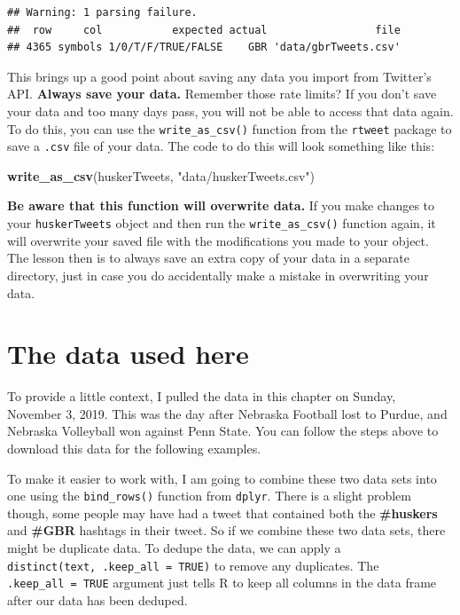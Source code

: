 \documentclass[
]{book}
\newenvironment{Shaded}{\begin{snugshade}}{\end{snugshade}}
\newcommand{\KeywordTok}[1]{\textcolor[rgb]{0.13,0.29,0.53}{\textbf{#1}}}
\newcommand{\NormalTok}[1]{#1}
\newcommand{\StringTok}[1]{\textcolor[rgb]{0.31,0.60,0.02}{#1}}
\begin{document}
\begin{verbatim}
## Warning: 1 parsing failure.
##  row     col           expected actual                 file
## 4365 symbols 1/0/T/F/TRUE/FALSE    GBR 'data/gbrTweets.csv'
\end{verbatim}

This brings up a good point about saving any data you import from Twitter's API. \textbf{Always save your data.} Remember those rate limits? If you don't save your data and too many days pass, you will not be able to access that data again. To do this, you can use the \texttt{write\_as\_csv()} function from the \texttt{rtweet} package to save a \texttt{.csv} file of your data. The code to do this will look something like this:

\begin{Shaded}
\begin{Highlighting}[]
\KeywordTok{write_as_csv}\NormalTok{(huskerTweets, }\StringTok{"data/huskerTweets.csv"}\NormalTok{)}
\end{Highlighting}
\end{Shaded}

\textbf{Be aware that this function will overwrite data.} If you make changes to your \texttt{huskerTweets} object and then run the \texttt{write\_as\_csv()} function again, it will overwrite your saved file with the modifications you made to your object. The lesson then is to always save an extra copy of your data in a separate directory, just in case you do accidentally make a mistake in overwriting your data.

\hypertarget{the-data-used-here}{%
\section{The data used here}\label{the-data-used-here}}

To provide a little context, I pulled the data in this chapter on Sunday, November 3, 2019. This was the day after Nebraska Football lost to Purdue, and Nebraska Volleyball won against Penn State. You can follow the steps above to download this data for the following examples.

To make it easier to work with, I am going to combine these two data sets into one using the \texttt{bind\_rows()} function from \texttt{dplyr}. There is a slight problem though, some people may have had a tweet that contained both the \textbf{\#huskers} and \textbf{\#GBR} hashtags in their tweet. So if we combine these two data sets, there might be duplicate data. To dedupe the data, we can apply a \texttt{distinct(text,\ .keep\_all\ =\ TRUE)} to remove any duplicates. The \texttt{.keep\_all\ =\ TRUE} argument just tells R to keep all columns in the data frame after our data has been deduped.
\end{document}
